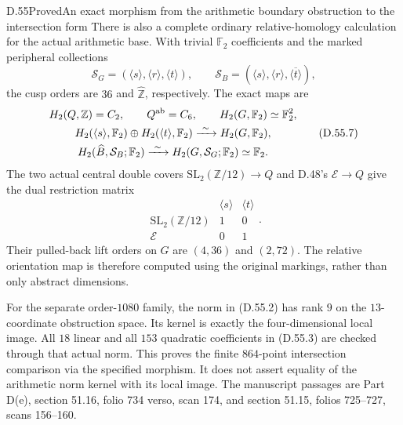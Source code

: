 \begin{statement}{D.55}{Proved}{An exact morphism from the arithmetic boundary obstruction to the intersection form}
There is also a complete ordinary
relative-homology calculation for
the actual arithmetic base. With trivial
\(\mathbb F_2\) coefficients and the
marked peripheral collections
\[
 \mathcal S_G=
       (\langle s\rangle,\langle r\rangle,\langle t\rangle),
 \qquad
 \mathcal S_B=
       (\langle s\rangle,\langle r\rangle,
                       \overline{\langle t\rangle}),
 \tag{D.55.6}
\]
the cusp orders are \(36\) and
\(\widehat{\mathbb Z}\), respectively.
The exact maps are
\[
 \begin{gathered}
 H_2(Q,\mathbb Z)=C_2,\qquad
 Q^{\rm ab}=C_6,\qquad
 H_2(G,\mathbb F_2)\simeq\mathbb F_2^2,\\
 H_2(\langle s\rangle,\mathbb F_2)
    \oplus H_2(\langle t\rangle,\mathbb F_2)
       \xrightarrow{\ \sim\ }H_2(G,\mathbb F_2),\\
 H_2(\widehat B,\mathcal S_B;\mathbb F_2)
       \xrightarrow{\ \sim\ }
       H_2(G,\mathcal S_G;\mathbb F_2)
       \simeq\mathbb F_2 .
 \end{gathered}
 \tag{D.55.7}
\]
The two actual central double covers
\(\mathrm{SL}_2(\mathbb Z/12)\to Q\)
and D.48's \(\mathcal E\to Q\)
give the dual restriction matrix
\[
 \begin{array}{c|cc}
 &\langle s\rangle&\langle t\rangle\\ \hline
 \mathrm{SL}_2(\mathbb Z/12)&1&0\\
 \mathcal E&0&1
 \end{array}.
 \tag{D.55.8}
\]
Their pulled-back lift orders on \(G\)
are \((4,36)\) and \((2,72)\).
The relative orientation map is
therefore computed using the original
markings, rather than only abstract
dimensions.

For the separate order-\(1080\) family,
the norm in (D.55.2) has rank \(9\)
on the \(13\)-coordinate obstruction
space. Its kernel is exactly the
four-dimensional local image.
All \(18\) linear and all \(153\)
quadratic coefficients in (D.55.3)
are checked through that actual norm.
This proves the finite \(864\)-point
intersection comparison via the
specified morphism. It does not
assert equality of the arithmetic
norm kernel with its local image.
The manuscript passages are Part D(e),
section 51.16, folio 734 verso,
scan 174, and section 51.15,
folios 725--727, scans 156--160.
\end{statement}
